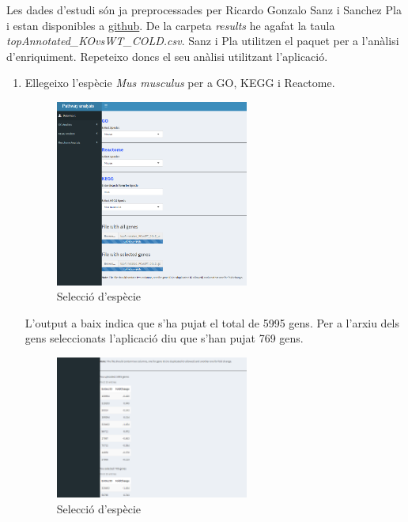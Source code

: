 Les dades d'estudi són ja preprocessades per Ricardo Gonzalo Sanz i Sanchez Pla i estan disponibles a \href{https://github.com/alexsanchezpla/StatisticalAnalysisOfMicroarrayData}{github}. De la carpeta \textit{results} he agafat la taula \textit{topAnnotated\_KOvsWT\_COLD.csv}. Sanz i Pla utilitzen el paquet  per a l'anàlisi d'enriquiment. Repeteixo doncs el seu anàlisi utilitzant l'aplicació. 


\begin{enumerate}

\item Ellegeixo l'espècie \textit{Mus musculus} per a GO, KEGG i Reactome.
\begin{figure}[H]
\centering
\includegraphics[width=0.6\textwidth]{figures/Estudi1_Fig1_Select_Specie.png} 
\caption{Selecció d'espècie}
\end{figure}

L'output a baix indica que s'ha pujat el total de 5995 gens. Per a l'arxiu dels gens seleccionats l'aplicació diu que s'han pujat 769 gens.

\begin{figure}[H]
\centering
\includegraphics[width=0.6\textwidth]{figures/Estudi1_Fig2_Select_Specie.png} 
\caption{Selecció d'espècie}
\end{figure}



\end{enumerate}
